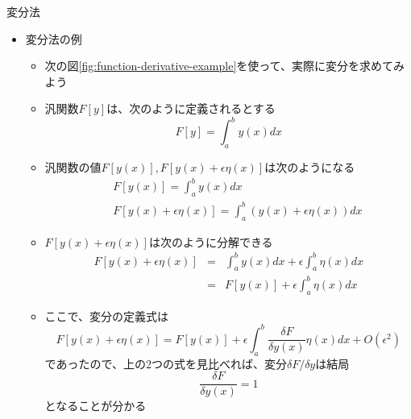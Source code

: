 \documentclass[dvipdfmx,notheorems,t]{beamer}
\begin{document}
\begin{frame}{変分法}

\begin{itemize}
	\item 変分法の例
	\begin{itemize}
		\item 次の図\ref{fig:function-derivative-example}を使って、実際に変分を求めてみよう
		\newline
		\item 汎関数$F[y]$は、次のように定義されるとする
		\begin{equation}
			F[y] = \int_a^b y(x) dx
		\end{equation}
		
		\item 汎関数の値$F[y(x)], F[y(x) + \epsilon \eta(x)]$は次のようになる
		\begin{eqnarray}
			&& F[y(x)] = \int_a^b y(x) dx \\
			&& F[y(x) + \epsilon \eta(x)] = \int_a^b \left( y(x) + \epsilon \eta(x) \right) dx
		\end{eqnarray}
		
		\item $F[y(x) + \epsilon \eta(x)]$は次のように分解できる
		\begin{eqnarray}
			F[y(x) + \epsilon \eta(x)] &=& \int_a^b y(x) dx + \epsilon \int_a^b \eta(x) dx \\
			&=& F[y(x)] + \epsilon \int_a^b \eta(x) dx
		\end{eqnarray}
		
		\item ここで、変分の定義式は
		\begin{equation}
			F[y(x) + \epsilon \eta(x)] = F[y(x)] + \epsilon \int_a^b \frac{\delta F}{\delta y(x)} \eta(x) dx + O(\epsilon^2)
		\end{equation}
		であったので、上の2つの式を見比べれば、変分$\delta F/\delta y$は結局
		\begin{equation}
			\frac{\delta F}{\delta y(x)} = 1
		\end{equation}
		となることが分かる
	\end{itemize}
\end{itemize}

\end{frame}
\end{document}
